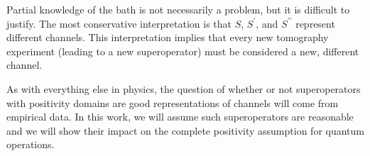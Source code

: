 Partial knowledge of the bath is not necessarily a problem, but it is difficult to justify.  The most conservative interpretation is that $S$, $S^\prime$, and $S^{\prime\prime}$ represent different channels.  This interpretation implies that every new tomography experiment (leading to a new superoperator) must be considered a new, different channel.

As with everything else in physics, the question of whether or not superoperators with positivity domains are good representations of channels will come from empirical data.  In this work, we will assume such superoperators are reasonable and we will show their impact on the complete positivity assumption for quantum operations.

